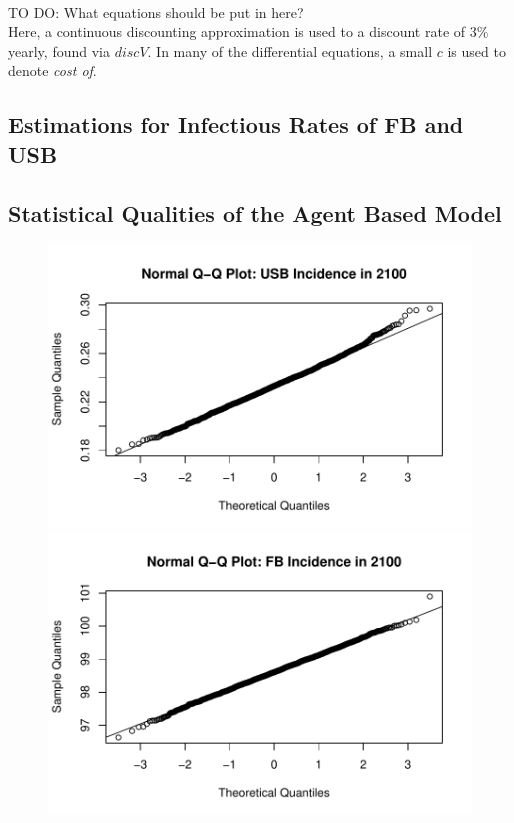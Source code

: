 \documentclass{amsart}
\newcommand{\TODO}[1]{\hfill\\{\huge \color{red} TO DO:} #1 \hfill \\}
\begin{document}
\TODO{What equations should be put in here?}

Here, a continuous discounting approximation is used to a discount rate of $3\%$
yearly, found via $discV$. In many of the differential equations, a small $c$ is
used to denote \emph{cost of}. 
\FloatBarrier
\subsection{Estimations for Infectious Rates of FB and USB}

\subsection{Statistical Qualities of the Agent Based Model}

\begin{figure}
    \includegraphics[scale=0.4]{figures/qqnormUSBInc.pdf}
    \includegraphics[scale=0.4]{figures/qqnormFBInc.pdf}

\end{figure}
\end{document}

